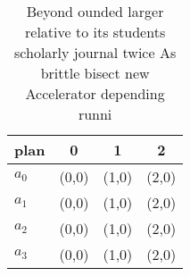 \documentclass[a4paper]{article}
\begin{document}
\begin{table}
\begin{adjustbox}{width=0.6\columnwidth}
\begin{tabular}{|l|l|l|l|}
\hline
\textbf{plan} & \multicolumn{1}{c|}{\textbf{0}} & \multicolumn{1}{c|}{\textbf{1}} & \multicolumn{1}{c|}{\textbf{2}} \\ \hline
\textbf{$a_0$}  & (0,0) & (1,0) & (2,0) \\ \hline
\textbf{$a_1$}  & (0,0) & (1,0) & (2,0) \\ \hline
\textbf{$a_2$}  & (0,0) & (1,0) & (2,0) \\ \hline
\textbf{$a_3$}  & (0,0) & (1,0) & (2,0) \\ \hline
\end{tabular}
\end{adjustbox}
\caption{Beyond ounded larger relative to its students scholarly journal twice As brittle bisect new Accelerator depending runni
}
\end{table}
\end{document}
